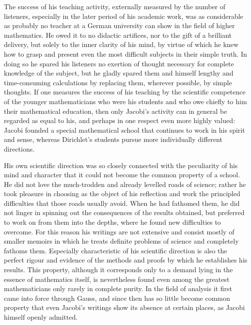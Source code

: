 \documentclass[11pt]{article}
\begin{document}
The success of his teaching activity, externally measured by the number of listeners, especially in the later period of his academic work, was as considerable as probably no teacher at a German university can show in the field of higher mathematics. He owed it to no didactic artifices, nor to the gift of a brilliant delivery, but solely to the inner clarity of his mind, by virtue of which he knew how to grasp and present even the most difficult subjects in their simple truth. In doing so he spared his listeners no exertion of thought necessary for complete knowledge of the subject, but he gladly spared them and himself lengthy and time-consuming calculations by replacing them, wherever possible, by simple thoughts. If one measures the success of his teaching by the scientific competence of the younger mathematicians who were his students and who owe chiefly to him their mathematical education, then only Jacobi's activity can in general be regarded as equal to his, and perhaps in one respect even more highly valued: Jacobi founded a special mathematical school that continues to work in his spirit and sense, whereas Dirichlet's students pursue more individually different directions.

His own scientific direction was so closely connected with the peculiarity of his mind and character that it could not become the common property of a school. He did not love the much-trodden and already levelled roads of science; rather he took pleasure in choosing as the object of his reflection and work the principled difficulties that those roads usually avoid. When he had fathomed them, he did not linger in spinning out the consequences of the results obtained, but preferred to work on from them into the depths, where he found new difficulties to overcome. For this reason his writings are not extensive and consist mostly of smaller memoirs in which he treats definite problems of science and completely fathoms them. Especially characteristic of his scientific direction is also the perfect rigour and evidence of the methods and proofs by which he establishes his results. This property, although it corresponds only to a demand lying in the essence of mathematics itself, is nevertheless found even among the greatest mathematicians only rarely in complete purity. In the field of analysis it first came into force through Gauss, and since then has so little become common property that even Jacobi's writings show its absence at certain places, as Jacobi himself openly admitted.
\end{document}
